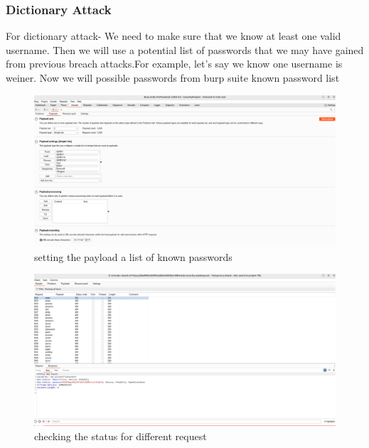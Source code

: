 \documentclass[
	a4paper, %
	12pt, %
]{CSSullivanBusinessReport}
\begin{document}
\subsubsection*{Dictionary Attack}
\begin{fullwidth}
    For dictionary attack- We need to make sure that we know at least one valid username. Then we will use a potential list of passwords that we may have gained from previous breach attacks.For example, let’s say we know one username is weiner. Now we will possible passwords from burp suite known password list

\begin{figure}[H]
    \centering
    \includegraphics[width=1\textwidth]{Images/anikaScreensots/dictionary1.png}
    \caption{setting the payload a list of known passwords}
    \label{fig:enter-label}
\end{figure}

\begin{figure}[H]
    \centering
    \includegraphics[width=1\textwidth]{Images/anikaScreensots/dictionary2.png}
    \caption{checking the status for different request}
    \label{fig:enter-label}
\end{figure}



\end{fullwidth}
\end{document}
